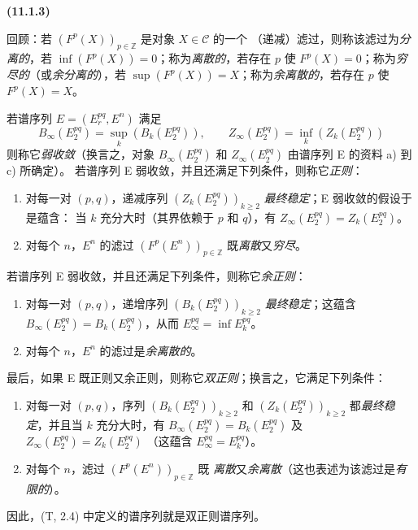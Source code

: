 \documentclass[UTF8,fontset=none,11pt,oneside,openany]{ctexbook}
\newenvironment{env}[1][]{%
  \par\medskip\noindent\textbf{(#1)}\ %
}{\par}
\newcommand{\oldpage}[2][]{%
  \hypertarget{ega-source-page-#1-#2}{}%
  \marginnote{\scriptsize\textbf{#1}~|~#2}\ignorespaces}
\let\EGAOriginalLabel\label
\renewcommand{\label}[1]{\phantomsection\EGAOriginalLabel{#1}}
\begin{document}
\begin{env}[11.1.3]
\label{0.11.1.3-fr}
\oldpage[0\textsubscript{III}]{25}
回顾：若 $(F^p(X))_{p\in\mathbb Z}$ 是对象 $X\in\mathcal C$ 的一个
（递减）滤过，则称该滤过为\emph{分离的}，若
$\inf(F^p(X))=0$；称为\emph{离散的}，若存在 $p$ 使
$F^p(X)=0$；称为\emph{穷尽的}（或\emph{余分离的}），若
$\sup(F^p(X))=X$；称为\emph{余离散的}，若存在 $p$ 使 $F^p(X)=X$。

若谱序列 $E=(E_r^{pq},E^n)$ 满足
\[
  B_\infty(E_2^{pq})=\sup_k(B_k(E_2^{pq})),\qquad
  Z_\infty(E_2^{pq})=\inf_k(Z_k(E_2^{pq}))
\]
则称它\emph{弱收敛}（换言之，对象 $B_\infty(E_2^{pq})$ 和
$Z_\infty(E_2^{pq})$ 由谱序列 E 的资料 a) 到 c) 所确定）。
若谱序列 E 弱收敛，并且还满足下列条件，则称它\emph{正则}：
\begin{enumerate}
  \item[$1^\circ$] 对每一对 $(p,q)$，递减序列
    $(Z_k(E_2^{pq}))_{k\geq2}$ \emph{最终稳定}；E 弱收敛的假设于是蕴含：
    当 $k$ 充分大时（其界依赖于 $p$ 和 $q$），有
    $Z_\infty(E_2^{pq})=Z_k(E_2^{pq})$。
  \item[$2^\circ$] 对每个 $n$，$E^n$ 的滤过
    $(F^p(E^n))_{p\in\mathbb Z}$ 既\emph{离散}又\emph{穷尽}。
\end{enumerate}

若谱序列 E 弱收敛，并且还满足下列条件，则称它\emph{余正则}：
\begin{enumerate}
  \item[$3^\circ$] 对每一对 $(p,q)$，递增序列
    $(B_k(E_2^{pq}))_{k\geq2}$ \emph{最终稳定}；这蕴含
    $B_\infty(E_2^{pq})=B_k(E_2^{pq})$，从而
    $E_\infty^{pq}=\inf E_k^{pq}$。
  \item[$4^\circ$] 对每个 $n$，$E^n$ 的滤过是\emph{余离散的}。
\end{enumerate}

最后，如果 E 既正则又余正则，则称它\emph{双正则}；换言之，它满足下列条件：
\begin{enumerate}
  \item[(a)] 对每一对 $(p,q)$，序列
    $(B_k(E_2^{pq}))_{k\geq2}$ 和 $(Z_k(E_2^{pq}))_{k\geq2}$
    都\emph{最终稳定}，并且当 $k$ 充分大时，有
    $B_\infty(E_2^{pq})=B_k(E_2^{pq})$ 及
    $Z_\infty(E_2^{pq})=Z_k(E_2^{pq})$
    （这蕴含 $E_\infty^{pq}=E_k^{pq}$）。
  \item[(b)] 对每个 $n$，滤过 $(F^p(E^n))_{p\in\mathbb Z}$ 既
    \emph{离散}又\emph{余离散}（这也表述为该滤过是\emph{有限的}）。
\end{enumerate}

因此，(T, 2.4) 中定义的谱序列就是双正则谱序列。
\end{env}
\end{document}
